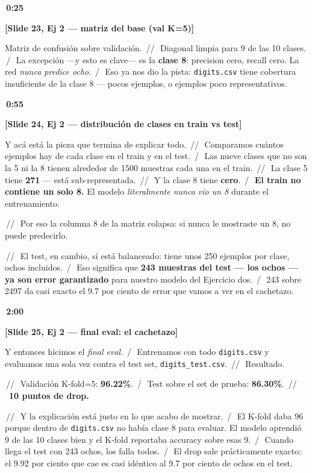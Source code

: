 \documentclass[11pt,a4paper]{article}
\newcommand{\code}[1]{\texttt{\textcolor{accent}{#1}}}
\newcommand{\slidenum}[1]{\textcolor{accent}{\textbf{[Slide #1]}}}
\newcommand{\timing}[1]{\textcolor{muted}{\textbf{\,#1\,}}}
\newcommand{\pausa}{\textcolor{muted}{\,/\,}}
\newcommand{\Pausa}{\textcolor{muted}{\,/\!/\,}}
\begin{document}
\timing{0:25}

\slidenum{23, Ej 2 — matriz del base (val K=5)}

Matriz de confusión sobre validación. \Pausa\ Diagonal limpia para 9 de las 10 clases. \pausa\ La excepción ---y esto es clave--- es la \textbf{clase 8}: precision cero, recall cero. La red \emph{nunca predice ocho}. \pausa\ Eso ya nos dio la pista: \code{digits.csv} tiene cobertura insuficiente de la clase 8 --- pocos ejemplos, o ejemplos poco representativos.

\timing{0:55}

\slidenum{24, Ej 2 — distribución de clases en train vs test}

Y acá está la pieza que termina de explicar todo. \Pausa\ Comparamos cuántos ejemplos hay de cada clase en el train y en el test. \pausa\ Las nueve clases que no son la 5 ni la 8 tienen alrededor de 1500 muestras cada una en el train. \Pausa\ La clase 5 tiene \textbf{271} --- está sub-representada. \Pausa\ Y la clase 8 tiene \textbf{cero}. \pausa\ \textbf{El train no contiene un solo 8.} El modelo \emph{literalmente nunca vio un 8} durante el entrenamiento.

\Pausa\ Por eso la columna 8 de la matriz colapsa: si nunca le mostraste un 8, no puede predecirlo.

\Pausa\ El test, en cambio, sí está balanceado: tiene unos 250 ejemplos por clase, ochos incluidos. \pausa\ Eso significa que \textbf{243 muestras del test --- los ochos --- ya son error garantizado} para nuestro modelo del Ejercicio dos. \pausa\ 243 sobre 2497 da casi exacto el 9.7 por ciento de error que vamos a ver en el cachetazo.

\timing{2:00}

\slidenum{25, Ej 2 — final eval: el cachetazo}

Y entonces hicimos el \emph{final eval}. \pausa\ Entrenamos con todo \code{digits.csv} y evaluamos una sola vez contra el test set, \code{digits\_test.csv}. \Pausa\ Resultado.

\Pausa\ Validación K-fold=5: \textbf{96.22\%}. \pausa\ Test sobre el set de prueba: \textbf{86.30\%}. \Pausa\ \textbf{10 puntos de drop.}

\Pausa\ Y la explicación está justo en lo que acabo de mostrar. \pausa\ El K-fold daba 96 porque dentro de \code{digits.csv} no había clase 8 para evaluar. El modelo aprendió 9 de las 10 clases bien y el K-fold reportaba accuracy sobre esas 9. \pausa\ Cuando llega el test con 243 ochos, los falla todos. \pausa\ El drop sale prácticamente exacto: el 9.92 por ciento que cae es casi idéntico al 9.7 por ciento de ochos en el test.
\end{document}
